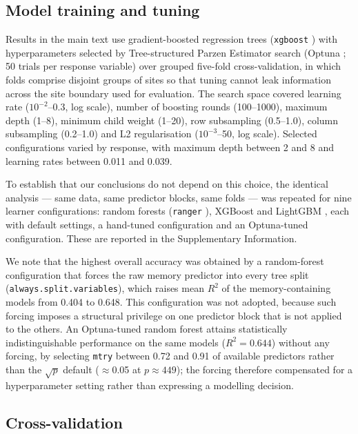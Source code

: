 \documentclass[pdflatex,sn-nature]{sn-jnl}%
\theoremstyle{thmstyleone}%
\theoremstyle{thmstyletwo}%
\theoremstyle{thmstylethree}%
\begin{document}
\subsection*{Model training and tuning}

Results in the main text use gradient-boosted regression trees (\texttt{xgboost} \cite{chen2016xgboost}) with hyperparameters selected by Tree-structured Parzen Estimator search (Optuna \cite{akiba2019optuna}; 50 trials per response variable) over grouped five-fold cross-validation, in which folds comprise disjoint groups of sites so that tuning cannot leak information across the site boundary used for evaluation. The search space covered learning rate ($10^{-2}$--0.3, log scale), number of boosting rounds (100--1000), maximum depth (1--8), minimum child weight (1--20), row subsampling (0.5--1.0), column subsampling (0.2--1.0) and L2 regularisation ($10^{-3}$--50, log scale). Selected configurations varied by response, with maximum depth between 2 and 8 and learning rates between 0.011 and 0.039.

To establish that our conclusions do not depend on this choice, the identical analysis --- same data, same predictor blocks, same folds --- was repeated for nine learner configurations: random forests (\texttt{ranger} \cite{wright2017ranger}), XGBoost and LightGBM \cite{ke2017lightgbm}, each with default settings, a hand-tuned configuration and an Optuna-tuned configuration. These are reported in the Supplementary Information.

We note that the highest overall accuracy was obtained by a random-forest configuration that forces the raw memory predictor into every tree split (\texttt{always.split.variables}), which raises mean $R^2$ of the memory-containing models from 0.404 to 0.648. This configuration was not adopted, because such forcing imposes a structural privilege on one predictor block that is not applied to the others. An Optuna-tuned random forest attains statistically indistinguishable performance on the same models ($R^2 = 0.644$) without any forcing, by selecting \texttt{mtry} between 0.72 and 0.91 of available predictors rather than the $\sqrt{p}$ default ($\approx$0.05 at $p \approx 449$); the forcing therefore compensated for a hyperparameter setting rather than expressing a modelling decision.

\subsection*{Cross-validation}
\end{document}
